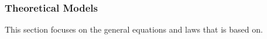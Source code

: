 \documentclass[12pt]{article}
\begin{document}
\subsubsection{Theoretical Models}\label{sec_theoretical}



This section focuses on the general equations and laws that \progname{} is based
on.  

~\newline
\end{document}
